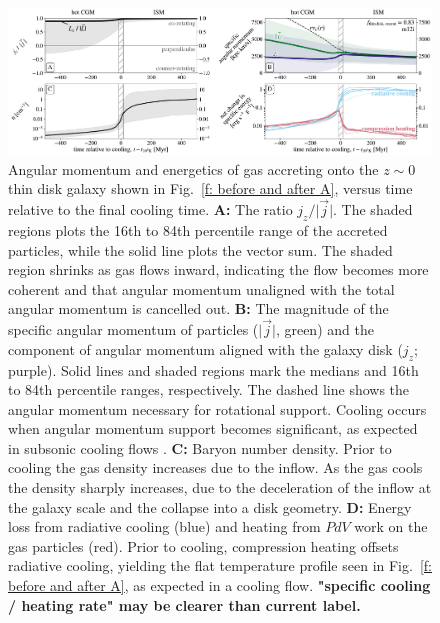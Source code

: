 \documentclass[fleqn,usenatbib]{mnras}
\begin{document}
\begin{figure}
\includegraphics[width=\textwidth]{figures/before_and_after/before_and_after_m12i_md.pdf}
\caption{
Angular momentum and energetics of gas accreting onto the $z\sim0$ thin disk galaxy shown in Fig.~\ref{f: before and after A}, versus time relative to the final cooling time.
\textbf{A:}
The ratio $j_z / \vert \vec j \vert$.
The shaded regions plots the 16th to 84th percentile range of the accreted particles, while the solid line plots the vector sum.
The shaded region shrinks as gas flows inward, indicating the flow becomes more coherent and that angular momentum unaligned with the total angular momentum is cancelled out. 
\textbf{B:}
The magnitude of the specific angular momentum of particles ($\vert\vec{j}\vert$, green) and the component of angular momentum aligned with the galaxy disk ($j_z$; purple). Solid lines and shaded regions mark the medians and 16th to 84th percentile ranges, respectively. 
The dashed line shows the angular momentum necessary for rotational support.
Cooling occurs when angular momentum support becomes significant, as expected in subsonic cooling flows \citep{Cowie1980, Stern2020}.
\textbf{C:}
Baryon number density.
Prior to cooling the gas density increases due to the inflow.
As the gas cools the density sharply increases, due to the deceleration of the inflow at the galaxy scale and the collapse into a disk geometry. 
\textbf{D:}
Energy loss from radiative cooling (blue) and heating from $PdV$ work on the gas particles (red).
Prior to cooling, compression heating offsets radiative cooling, yielding the flat temperature profile seen in Fig.~\ref{f: before and after A}, as expected in a cooling flow.
\textbf{"specific cooling / heating rate" may be clearer than current label.}
}
\label{f: before and after B}
\end{figure}
\end{document}
